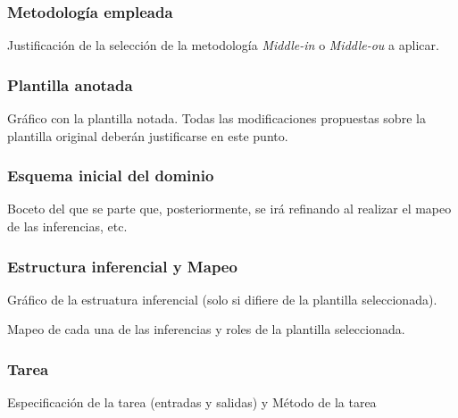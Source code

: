\documentclass[12pt,a4paper,twoside,spanish]{article}      %
\begin{document}
\subsubsection{Metodología empleada}
Justificación de la selección de la metodología \emph{Middle-in} o
\emph{Middle-ou} a aplicar.

\subsubsection{Plantilla anotada}

Gráfico con la plantilla notada. Todas las modificaciones propuestas sobre la
plantilla original deberán justificarse en este punto.

\subsubsection{Esquema inicial del dominio}
Boceto del que se parte que,
posteriormente, se irá refinando al realizar el mapeo de las
inferencias, etc.

\subsubsection{Estructura inferencial y Mapeo}

Gráfico de la estruatura inferencial (solo si difiere de la plantilla seleccionada).

Mapeo de cada una de las inferencias y roles de la plantilla seleccionada.

\subsubsection{Tarea}
Especificación de la tarea (entradas y salidas) y Método de la tarea
\end{document}
